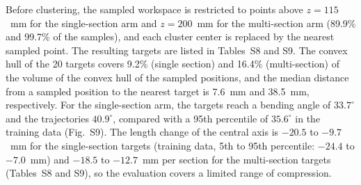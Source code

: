 Before clustering, the sampled workspace is restricted to points above $z = 115$~mm for the single-section arm and $z = 200$~mm for the multi-section arm (89.9\% and 99.7\% of the samples), and each cluster center is replaced by the nearest sampled point. The resulting targets are listed in Tables~S8 and S9. The convex hull of the 20 targets covers 9.2\% (single section) and 16.4\% (multi-section) of the volume of the convex hull of the sampled positions, and the median distance from a sampled position to the nearest target is 7.6~mm and 38.5~mm, respectively. For the single-section arm, the targets reach a bending angle of $33.7^\circ$ and the trajectories $40.9^\circ$, compared with a 95th percentile of $35.6^\circ$ in the training data (Fig.~S9). The length change of the central axis is $-20.5$ to $-9.7$~mm for the single-section targets (training data, 5th to 95th percentile: $-24.4$ to $-7.0$~mm) and $-18.5$ to $-12.7$~mm per section for the multi-section targets (Tables~S8 and S9), so the evaluation covers a limited range of compression.
